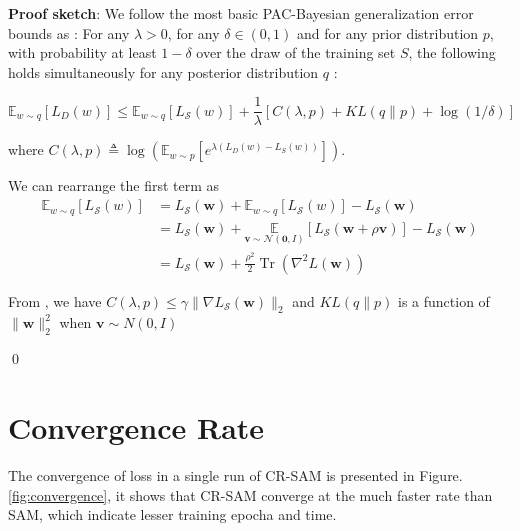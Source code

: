 \documentclass[letterpaper]{article} %
\theoremstyle{plain}
\theoremstyle{definition}
\begin{document}
\textbf{Proof sketch}: 
We follow the most basic PAC-Bayesian generalization error bounds as \cite{JMLR:v17:15-290, gat2022importance}: For any $\lambda>0$, for any $\delta \in(0,1)$ and for any prior distribution $p$, with probability at least $1-\delta$ over the draw of the training set $S$, the following holds simultaneously for any posterior distribution $q$ :

\begin{equation}
\mathbb{E}_{w \sim q}\left[L_D(w)\right] \leq \mathbb{E}_{w \sim q}\left[L_\mathcal{S}(w)\right]+\frac{1}{\lambda}[C(\lambda, p)+K L(q \| p)+\log (1 / \delta)]
\end{equation}

where $C(\lambda, p) \triangleq \log \left(\mathbb{E}_{w \sim p}\left[e^{\lambda\left(L_D(w)-L_S(w)\right)}\right]\right)$.

We can rearrange the first term as 
\begin{align*}
\mathbb{E}_{w \sim q}\left[L_\mathcal{S}(w)\right] &= L_{\mathcal{S}}(\boldsymbol{w}) 
 + \mathbb{E}_{w \sim q}\left[L_\mathcal{S}(w)\right] - L_{\mathcal{S}}(\boldsymbol{w}) \\
 &= L_{\mathcal{S}}(\boldsymbol{w}) + \underset{\boldsymbol{\boldsymbol{v}} \sim \mathcal{N}(\mathbf{0}, I)}{\mathbb{E}}\left[L_{\mathcal{S}}(\boldsymbol{w}+\rho\boldsymbol{v})\right]-L_{\mathcal{S}}(\boldsymbol{w}) \\
 &= L_{\mathcal{S}}(\boldsymbol{w}) + \frac{\rho^2}{2} \operatorname{Tr}\left(\nabla^2 L\left(\boldsymbol{w}\right)\right)
\end{align*}

From \cite{gat2022importance}, we have $C(\lambda, p) \leq \gamma\|\nabla L_{\mathcal{S}}(\boldsymbol{w})\|_2$ and $K L(q \| p)$ is a function of $\|\boldsymbol{w}\|_2^2$  when $\boldsymbol{v} \sim N(0, I)$

\qed


\section{Convergence Rate}

The convergence of loss in a single run of CR-SAM is presented in Figure. \ref{fig:convergence}, it shows that CR-SAM converge at the much faster rate than SAM, which indicate lesser training epocha and time.
\end{document}
